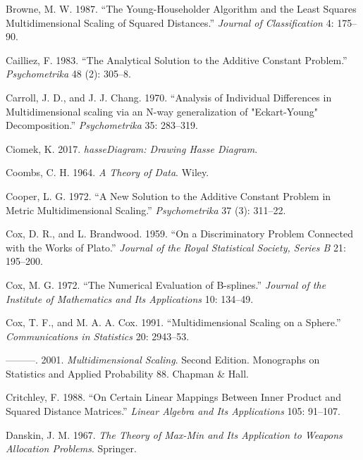 \documentclass[
  12pt,
  letterpaper,
  DIV=11,
  numbers=noendperiod]{scrreprt}
\newlength{\cslhangindent}
\newenvironment{CSLReferences}[2] %
 {\begin{list}{}{%
  \setlength{\itemindent}{0pt}
  \setlength{\leftmargin}{0pt}
  \setlength{\parsep}{0pt}
  \ifodd #1
   \setlength{\leftmargin}{\cslhangindent}
   \setlength{\itemindent}{-1\cslhangindent}
  \fi
  \setlength{\itemsep}{#2\baselineskip}}}
 {\end{list}}
\theoremstyle{remark}
\begin{document}
\begin{CSLReferences}{1}{0}
Browne, M. W. 1987. {``{The Young-Householder Algorithm and the Least
Squares Multidimensional Scaling of Squared Distances}.''} \emph{Journal
of Classification} 4: 175--90.

Cailliez, F. 1983. {``{The Analytical Solution to the Additive Constant
Problem}.''} \emph{Psychometrika} 48 (2): 305--8.

Carroll, J. D., and J. J. Chang. 1970. {``{Analysis of Individual
Differences in Multidimensional scaling via an N-way generalization of
"Eckart-Young" Decomposition.}''} \emph{Psychometrika} 35: 283--319.

Ciomek, K. 2017. \emph{{hasseDiagram: Drawing Hasse Diagram}}.

Coombs, C. H. 1964. \emph{{A Theory of Data}}. Wiley.

Cooper, L. G. 1972. {``{A New Solution to the Additive Constant Problem
in Metric Multidimensional Scaling}.''} \emph{Psychometrika} 37 (3):
311--22.

Cox, D. R., and L. Brandwood. 1959. {``{On a Discriminatory Problem
Connected with the Works of Plato}.''} \emph{Journal of the Royal
Statistical Society, Series B} 21: 195--200.

Cox, M. G. 1972. {``{The Numerical Evaluation of B-splines}.''}
\emph{Journal of the Institute of Mathematics and Its Applications} 10:
134--49.

Cox, T. F., and M. A. A. Cox. 1991. {``{Multidimensional Scaling on a
Sphere}.''} \emph{Communications in Statistics} 20: 2943--53.

---------. 2001. \emph{Multidimensional Scaling}. Second Edition.
Monographs on Statistics and Applied Probability 88. Chapman \& Hall.

Critchley, F. 1988. {``{On Certain Linear Mappings Between Inner Product
and Squared Distance Matrices}.''} \emph{Linear Algebra and Its
Applications} 105: 91--107.

Danskin, J. M. 1967. \emph{The Theory of Max-Min and Its Application to
Weapons Allocation Problems}. Springer.


\end{CSLReferences}
\end{document}
